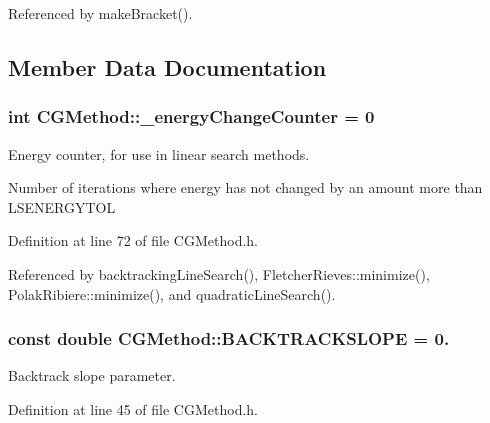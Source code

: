 Referenced by make\+Bracket().



\subsection{Member Data Documentation}
\hypertarget{classCGMethod_aadb778c988685e46d7d109350973d826}{
\subsubsection[{\+\_\+energy\+Change\+Counter}]{\setlength{\rightskip}{0pt plus 5cm}int C\+G\+Method\+::\+\_\+energy\+Change\+Counter = 0\hspace{0.3cm}{\ttfamily [protected]}}}\label{classCGMethod_aadb778c988685e46d7d109350973d826}


Energy counter, for use in linear search methods. 

Number of iterations where energy has not changed by an amount more than L\+S\+E\+N\+E\+R\+G\+Y\+T\+O\+L 

Definition at line 72 of file C\+G\+Method.\+h.



Referenced by backtracking\+Line\+Search(), Fletcher\+Rieves\+::minimize(), Polak\+Ribiere\+::minimize(), and quadratic\+Line\+Search().

\hypertarget{classCGMethod_aa7a8cad90cb1961052e323ded645b4c2}{
\subsubsection[{B\+A\+C\+K\+T\+R\+A\+C\+K\+S\+L\+O\+P\+E}]{\setlength{\rightskip}{0pt plus 5cm}const double C\+G\+Method\+::\+B\+A\+C\+K\+T\+R\+A\+C\+K\+S\+L\+O\+P\+E = 0.\hspace{0.3cm}{\ttfamily [protected]}}}\label{classCGMethod_aa7a8cad90cb1961052e323ded645b4c2}


Backtrack slope parameter. 



Definition at line 45 of file C\+G\+Method.\+h.



